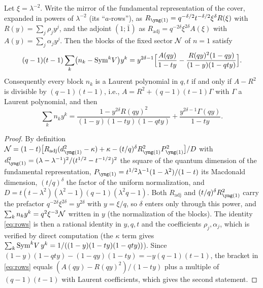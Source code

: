 \begin{proposition}\label{prop:rows}
Let $\xi = \lambda^{-2}$. Write the mirror of the fundamental representation of the cover, expanded in powers of $\lambda^{-2}$ (its ``$a$-rows''), as $R_{\yone} = q^{-\delta/2}t^{-\delta/2}\xi^\delta R(\xi)$ with $R(y) = \sum_j \rho_j y^j$, and the adjoint $(1;\bar1)$ as $R_{\mathrm{adj}} = q^{-2\delta}\xi^{2\delta}A(\xi)$ with $A(y) = \sum_j \alpha_j y^j$. Then the blocks of the fixed sector $\mathcal{N}$ of $n = 1$ satisfy
\begin{equation}\label{eq:rows}
(q-1)(t-1)\sum_k \bigl(n_k - \mathrm{Sym}^kV\bigr) y^k = y^{2\delta-1}\Bigl[\frac{A(qy)}{1-ty} - \frac{R(qy)^2(1-qy)}{(1-y)(1-qty)}\Bigr].
\end{equation}
Consequently every block $n_k$ is a Laurent polynomial in $q, t$ if and only if $A - R^2$ is divisible by $(q-1)(t-1)$, i.e., $A = R^2 + (q-1)(t-1)\Gamma$ with $\Gamma$ a Laurent polynomial, and then
\begin{equation}\label{eq:rows2}
\sum_k n_k y^k = \frac{1 - y^{2\delta}R(qy)^2}{(1-y)(1-ty)(1-qty)} + \frac{y^{2\delta-1}\Gamma(qy)}{1-ty}.
\end{equation}
\end{proposition}
\begin{proof}
By definition $\Nfix = (1-t)\bigl[R_{\mathrm{adj}}(d_{\yone}^2 - \kappa) + \kappa - (t/q)^\delta R_{\yone}^2 P_{\yone}^2\bigr]/D$ with $d_{\yone}^2 = (\lambda - \lambda^{-1})^2/(t^{1/2} - t^{-1/2})^2$ the square of the quantum dimension of the fundamental representation, $P_{\yone} = t^{1/2}\lambda^{-1}(1 - \lambda^2)/(1-t)$ its Macdonald dimension, $(t/q)^\delta$ the factor of the uniform normalization, and $D = t(t - \lambda^2)(\lambda^2 - 1)(q - 1)(\lambda^2 q - 1)$. Both $R_{\mathrm{adj}}$ and $(t/q)^\delta R_{\yone}^2$ carry the prefactor $q^{-2\delta}\xi^{2\delta} = y^{2\delta}$ with $y = \xi/q$, so $\delta$ enters only through this power, and $\sum_k n_k y^k = q^2\xi^{-3}\mathcal{N}$ written in $y$ (the normalization of the blocks). The identity \eqref{eq:rows} is then a rational identity in $y, q, t$ and the coefficients $\rho_j, \alpha_j$, which is verified by direct computation (the $\kappa$ term gives $\sum_k \mathrm{Sym}^kV\,y^k = 1/((1-y)(1-ty)(1-qty))$). Since $(1-y)(1-qty) - (1-qy)(1-ty) = -y(q-1)(t-1)$, the bracket in \eqref{eq:rows} equals $(A(qy) - R(qy)^2)/(1-ty)$ plus a multiple of $(q-1)(t-1)$ with Laurent coefficients, which gives the second statement.
\end{proof}
